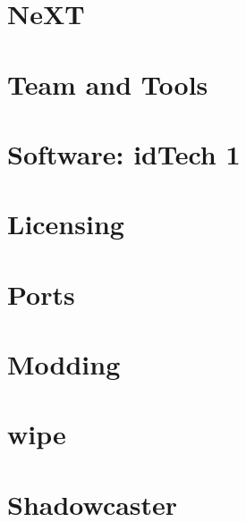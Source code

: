 \documentclass{book}
\begin{document}
        


        
     \chapter{NeXT}
          


    

    \chapter{Team and Tools}
       
       
      
      
      





    \chapter{Software: idTech 1}
      
      
      
      
      
      
      
      
      
      
      
      
      
      

    \chapter{Licensing}
      
      
      

    \chapter{Ports}        
          

    \chapter{Modding}
      

    \appendix
    \appendixpage
      \chapter{wipe}
      
      \chapter{Shadowcaster}  
      
\end{document}
